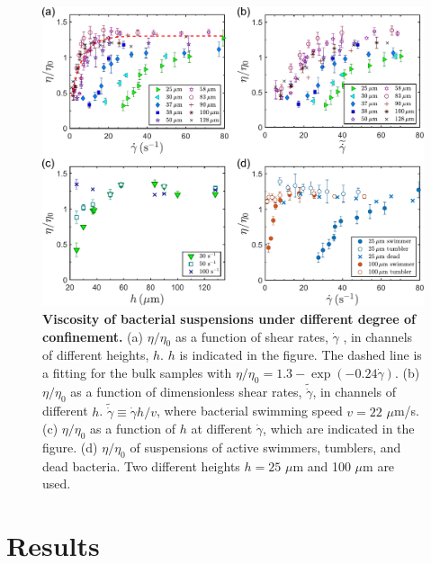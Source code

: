 \begin{figure}[!ht]
	\begin{center}
	\includegraphics[width=5.5 in]{Figs/3-Rheo/2.pdf}
	\end{center}
	\caption[Viscosity of bacterial suspensions under different degree of confinement]
	{
	\textbf{Viscosity of bacterial suspensions under different degree of confinement.}
  (a) $\eta/\eta_0$ as a function of shear rates, $\dot\gamma$ , in channels of different heights, $h$. $h$ is indicated in the figure. The dashed line is a fitting for the bulk samples with $\eta/\eta_0=1.3-\exp(-0.24\dot\gamma)$. (b) $\eta/\eta_0$ as a function of dimensionless shear rates, $\tilde{\dot\gamma}$, in channels of different $h$. $\tilde{\dot\gamma}\equiv\dot\gamma h/v$, where bacterial swimming speed $v = 22$ $\mu$m/s.
  (c) $\eta/\eta_0$ as a function of $h$ at different $\dot\gamma$, which are indicated in the figure.
  (d) $\eta/\eta_0$ of suspensions of active swimmers, tumblers, and dead bacteria. Two different heights $h = 25$ $\mu$m and 100 $\mu$m are used.
	}
	\label{fig:3-rheology}
\end{figure}

\section{Results}
